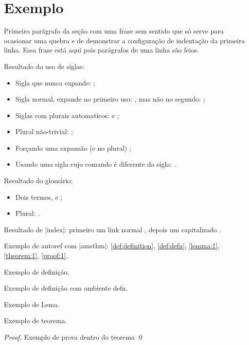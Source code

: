 
\chapter{Exemplo}
\label{ch:exemplo}

 Primeiro parágrafo da seção com uma frase sem sentido que só serve para ocasionar uma quebra e de demonstrar a configuração de indentação da primeira linha. Essa frase está aqui pois parágrafos de uma linha são feios.

Resultado do uso de siglas:
\begin{itemize}
\item Sigla que nunca expande: \API;
\item Sigla normal, expande no primeiro uso: \DHT, mas não no segundo: \DHT;
\item Siglas com plurais automaticos: \APIs e \DHTs;
\item Plural não-trivial: \SQs;
\item Forçando uma expansão (e no plural) ;
\item Usando uma sigla cujo comando é diferente da sigla: \WTC.
\end{itemize}

Resultado do glossário:
\begin{itemize}
\item Dois termos, \polling e \proxy;
\item Plural: \proxys.
\end{itemize}

Resultado de \mla|index|: primeiro um link normal , depois um capitalizado .

Exemplo de autoref com \mla|amsthm|: \autoref{def:definition}, \autoref{def:defn}, \autoref{lemma:1}, \autoref{theorem:1}, \autoref{proof:1}.

\begin{definition}
  \label{def:definition}
  Exemplo de definição.
\end{definition}

\begin{defn}
  \label{def:defn}
  Exemplo de definição com ambiente defn.
\end{defn}

\begin{lemma}
  \label{lemma:1}
  Exemplo de Lema.
\end{lemma}

\begin{theorem}
  \label{theorem:1}
  Exemplo de teorema.
  \begin{proof}
    Exemplo de prova dentro do teorema \qed
  \end{proof}
\end{theorem}

